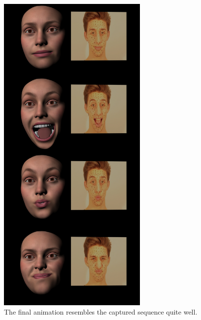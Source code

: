 \begin{figure}[htbp!]
\centering
\includegraphics[width=0.65\textwidth]{img/results/emily_results}
	\caption{The final animation resembles the captured sequence quite well.}
	\label{fig:results1}
\end{figure}

